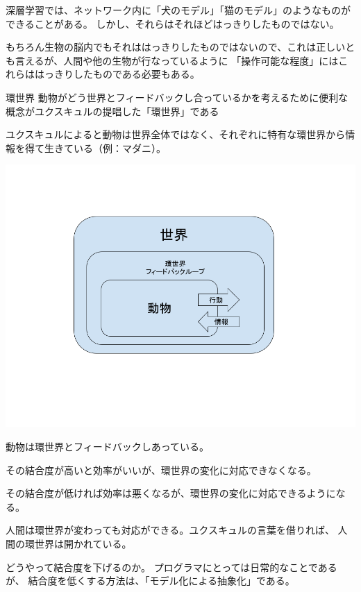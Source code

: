 \documentclass[12pt, unicode]{beamer}
\begin{document}
\begin{frame}

深層学習では、ネットワーク内に「犬のモデル」「猫のモデル」のようなものができることがある。
しかし、それらはそれほどはっきりしたものではない。

もちろん生物の脳内でもそれははっきりしたものではないので、これは正しいとも言えるが、人間や他の生物が行なっているように
「操作可能な程度」にはこれらははっきりしたものである必要もある。

\end{frame}

\begin{frame}{環世界}
動物がどう世界とフィードバックし合っているかを考えるために便利な概念がユクスキュルの提唱した「環世界」である

ユクスキュルによると動物は世界全体ではなく、それぞれに特有な環世界から情報を得て生きている（例：マダニ）。

\vspace{-2\baselineskip}
\centering
\includegraphics[keepaspectratio, scale=0.3]{umwelt.png}

\end{frame}
\begin{frame}

動物は環世界とフィードバックしあっている。

その結合度が高いと効率がいいが、環世界の変化に対応できなくなる。

その結合度が低ければ効率は悪くなるが、環世界の変化に対応できるようになる。

人間は環世界が変わっても対応ができる。ユクスキュルの言葉を借りれば、
人間の環世界は開かれている。

どうやって結合度を下げるのか。
プログラマにとっては日常的なことであるが、
結合度を低くする方法は、「モデル化による抽象化」である。

\end{frame}
\end{document}
